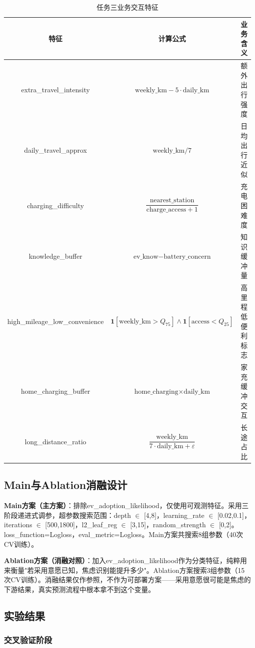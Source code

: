 \begin{table}[H]
\centering
\caption{任务三业务交互特征}
\label{tab:t3_features}
\begin{tabular}{ccp{4cm}}
\toprule
\textbf{特征} & \textbf{计算公式} & \textbf{业务含义} \\
\midrule
extra\_travel\_intensity & $\text{weekly\_km} - 5 \cdot \text{daily\_km}$ & 额外出行强度 \\
daily\_travel\_approx & $\text{weekly\_km} / 7$ & 日均出行近似 \\
charging\_difficulty & $\dfrac{\text{nearest\_station}}{\text{charge\_access} + 1}$ & 充电困难度 \\
knowledge\_buffer & $\text{ev\_know} - \text{battery\_concern}$ & 知识缓冲量 \\
high\_mileage\_low\_convenience & $\mathbf{1}[\text{weekly\_km} > Q_{75}] \land \mathbf{1}[\text{access} < Q_{25}]$ & 高里程低便利标志 \\
home\_charging\_buffer & $\text{home\_charging} \times \text{daily\_km}$ & 家充缓冲交互 \\
long\_distance\_ratio & $\dfrac{\text{weekly\_km}}{7 \cdot \text{daily\_km} + \varepsilon}$ & 长途占比 \\
\bottomrule
\end{tabular}
\end{table}

\subsection{Main与Ablation消融设计}

\textbf{Main方案（主方案）}：排除ev\_adoption\_likelihood，仅使用可观测特征。采用三阶段递进式调参，超参数搜索范围：depth $\in$ [4,8]，learning\_rate $\in$ [0.02,0.1]，iterations $\in$ [500,1800]，l2\_leaf\_reg $\in$ [3,15]，random\_strength $\in$ [0,2]。loss\_function=Logloss，eval\_metric=Logloss。Main方案共搜索8组参数（40次CV训练）。

\textbf{Ablation方案（消融对照）}：加入ev\_adoption\_likelihood作为分类特征，纯粹用来衡量"若采用意愿已知，焦虑识别能提升多少"。Ablation方案搜索3组参数（15次CV训练）。消融结果仅作参照，不作为可部署方案——采用意愿很可能是焦虑的下游结果，真实预测流程中根本拿不到这个变量。

\subsection{实验结果}

\subsubsection{交叉验证阶段}

